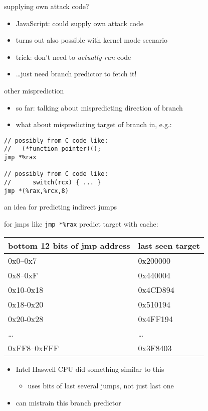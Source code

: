 \begin{frame}{supplying own attack code?}
    \begin{itemize}
    \item JavaScript: could supply own attack code
    \vspace{.5cm}
    \item turns out also possible with kernel mode scenario
    \item trick: don't need to \textit{actually run} code
    \item \ldots just need branch predictor to fetch it!
    \end{itemize}
\end{frame}

\begin{frame}[fragile]{other misprediction}
\begin{itemize}
\item so far: talking about mispredicting direction of branch
\item what about mispredicting target of branch in, e.g.:
\end{itemize}
\begin{lstlisting}
// possibly from C code like:
//   (*function_pointer)();
jmp *%rax           

// possibly from C code like:
//      switch(rcx) { ... }
jmp *(%rax,%rcx,8)  
\end{lstlisting}
\end{frame}

\begin{frame}[fragile]{an idea for predicting indirect jumps}

for jmps like \lstinline|jmp *%rax| predict target with cache: \\
\begin{tabular}{ll}
bottom 12 bits of jmp address & last seen target \\ \hline
0x0--0x7 & 0x200000 \\
0x8--0xF & 0x440004 \\
0x10-0x18 & 0x4CD894 \\
0x18-0x20 & 0x510194 \\
0x20-0x28 & 0x4FF194 \\
\ldots & \ldots \\
0xFF8--0xFFF & 0x3F8403 \\
\end{tabular}
\begin{itemize}
\item Intel Haswell CPU did something similar to this
    \begin{itemize}
    \item uses bits of last several jumps, not just last one
    \end{itemize}
\item can mistrain this branch predictor
\end{itemize}
\end{frame}

